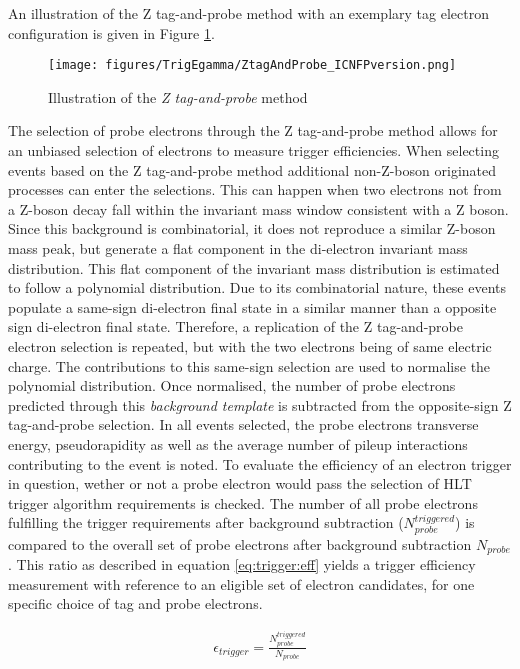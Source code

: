 An illustration of the Z tag-and-probe method with an exemplary tag electron configuration is given in Figure \ref{fig:trigger:TnP}.

\begin{figure}
\centering
\texttt{[image: figures/TrigEgamma/ZtagAndProbe\_ICNFPversion.png]}
\caption{Illustration of the \textit{Z tag-and-probe} method  \label{fig:trigger:TnP}}
\end{figure}

The selection of probe electrons through the Z tag-and-probe method allows for an unbiased selection of electrons to measure trigger efficiencies. 
When selecting events based on the Z tag-and-probe method additional non-Z-boson originated processes can enter the selections. This can happen when two electrons not from a Z-boson decay fall within the invariant mass window consistent with a Z boson.
Since this background is combinatorial,  it does not reproduce a similar Z-boson mass peak,  but  generate a flat component in the di-electron invariant mass distribution.  
This flat component of the invariant mass distribution is estimated to follow a polynomial  distribution.  Due to its combinatorial nature,  these events populate a same-sign di-electron final state in a similar manner than a opposite sign di-electron final state.  
Therefore, a replication of the Z tag-and-probe electron selection is repeated,  but with the two electrons being of same electric charge.
The contributions to this same-sign selection are used to normalise the polynomial distribution.  Once normalised, the number of probe electrons predicted through this \textit{background template} is subtracted from the opposite-sign Z tag-and-probe selection.
In all events selected,  the probe electrons transverse energy,  pseudorapidity as well as the average number of pileup interactions contributing to the event is noted. 
To evaluate the efficiency of an electron trigger in question,  wether or not a probe electron would pass the selection of \ac{HLT} trigger algorithm requirements is checked. 
The number of all probe electrons fulfilling the trigger requirements after background subtraction ($N_{probe}^{triggered}$) is compared to the overall set of probe electrons after background subtraction $N_{probe}$.  This ratio as described in equation \ref{eq:trigger:eff} yields a trigger efficiency measurement with reference to an eligible set of electron candidates,  for one specific choice of tag and probe electrons.

\begin{align}
\epsilon_{trigger} = \frac{N_{probe}^{triggered}}{N_{probe}}
\label{eq:trigger:eff}
\end{align}

